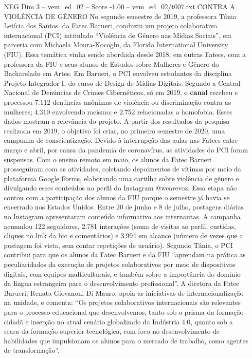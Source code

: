 \begin{textsample}{NEG Dim 3 – vem\_ed\_02 – Score -1.00 – vem\_ed\_02/t007.txt}  \label{ex:f3_neg_049}
CONTRA A VIOLÊNCIA DE GÊNERO No segundo semestre de 2019, a professora Tânia Letícia dos Santos, da Fatec Barueri, conduziu um projeto colaborativo internacional (PCI) intitulado “Violência de Gênero nas Mídias Sociais”, em parceria com Michaela Moura-Kocoglu, da Florida International University (FIU).
Essa temática vinha sendo abordada desde 2018, em outras Fatecs, com a professora da FIU e seus alunos de Estudos sobre Mulheres e Gênero do Bacharelado em Artes.
Em Barueri, o PCI envolveu estudantes da disciplina Projeto Integrador I, do curso de Design de Mídias Digitais.
Segundo a Central Nacional de Denúncias de Crimes Cibernéticos, só em 2019, o \textbf{canal} recebeu e processou 7.112 denúncias anônimas de violência ou discriminação contra as mulheres; 4.310 envolvendo racismo; e 2.752 relacionadas a homofobia.
Esses dados mostram a relevância do projeto.
A partir dos resultados da pesquisa realizada em 2019, o objetivo foi criar, no primeiro semestre de 2020, uma campanha de conscientização.
Devido à interrupção das aulas nas Fatecs entre março e abril, por causa da pandemia de coronavírus, as atividades do PCI foram suspensas.
Com o ensino remoto em maio, os alunos da Fatec Barueri prosseguiram com as atividades, coletando depoimentos de vítimas por meio da plataforma Google Forms, elaborando uma cartilha sobre violência de gênero e divulgando esses conteúdos no perfil do Instagram @wearevoz.
Essa etapa não contou com a participação dos alunos da FIU porque o semestre já havia se encerrado nos Estados Unidos.
Entre 20 de junho e 8 de julho, postagens diárias no Instagram apresentaram conteúdo informativo aos internautas.
A campanha acumulou 122 seguidores, 2.781 interações (soma de visitas ao perfil, curtidas, cliques no link da bio e comentários) e 3.994 em alcance (número de vezes que a postagem foi vista, sem contar repetições de usuário).
Segundo Tânia, o PCI contribui para que os alunos da Fatec Barueri e da FIU “aprendam na prática as peculiaridades da execução de projetos colaborativos por meio de dispositivos digitais, com equipes multiculturais, e também sobre a importância do domínio da língua estrangeira para o desenvolvimento profissional”.
A diretora da Fatec Barueri, Renata Giovanoni Di Mauro, apoia as iniciativas de internacionalização na unidade, e comenta: “Os projetos colaborativos internacionais são relevantes para o processo educacional que desenvolvemos, tanto sob o prisma da formação cidadã e inserção no atual cenário globalizado da Indústria 4.0, quanto sob a seara da formação superior tecnológica, com foco no desenvolvimento de habilidades que impulsionam os alunos para o mercado de trabalho, como agentes de transformação”.

\end{textsample}
